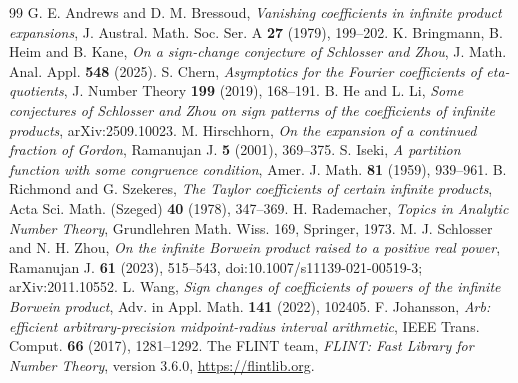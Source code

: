 \documentclass[11pt]{amsart}
\theoremstyle{remark}
\theoremstyle{definition}
\begin{document}
\begin{thebibliography}{99}
 G. E. Andrews and D. M. Bressoud, \emph{Vanishing coefficients in infinite product expansions}, J. Austral. Math. Soc. Ser. A \textbf{27} (1979), 199--202.
 K. Bringmann, B. Heim and B. Kane, \emph{On a sign-change conjecture of Schlosser and Zhou}, J. Math. Anal. Appl. \textbf{548} (2025).
 S. Chern, \emph{Asymptotics for the Fourier coefficients of eta-quotients}, J. Number Theory \textbf{199} (2019), 168--191.
 B. He and L. Li, \emph{Some conjectures of Schlosser and Zhou on sign patterns of the coefficients of infinite products}, arXiv:2509.10023.
 M. Hirschhorn, \emph{On the expansion of a continued fraction of Gordon}, Ramanujan J. \textbf{5} (2001), 369--375.
 S. Iseki, \emph{A partition function with some congruence condition}, Amer. J. Math. \textbf{81} (1959), 939--961.
 B. Richmond and G. Szekeres, \emph{The Taylor coefficients of certain infinite products}, Acta Sci. Math. (Szeged) \textbf{40} (1978), 347--369.
 H. Rademacher, \emph{Topics in Analytic Number Theory}, Grundlehren Math. Wiss. 169, Springer, 1973.
 M. J. Schlosser and N. H. Zhou, \emph{On the infinite Borwein product raised to a positive real power}, Ramanujan J. \textbf{61} (2023), 515--543, doi:10.1007/s11139-021-00519-3; arXiv:2011.10552.
 L. Wang, \emph{Sign changes of coefficients of powers of the infinite Borwein product}, Adv. in Appl. Math. \textbf{141} (2022), 102405.
 F. Johansson, \emph{Arb: efficient arbitrary-precision midpoint-radius interval arithmetic}, IEEE Trans. Comput. \textbf{66} (2017), 1281--1292.
 The FLINT team, \emph{FLINT: Fast Library for Number Theory}, version 3.6.0, \url{https://flintlib.org}.
\end{thebibliography}
\end{document}
